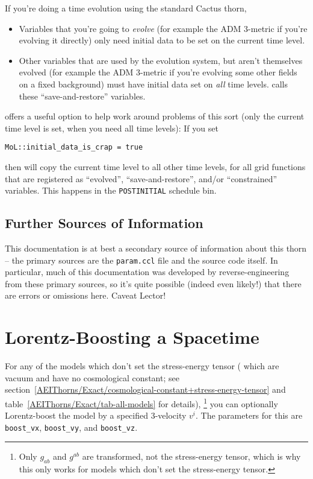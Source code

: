 If you're doing a time evolution using the standard Cactus 
thorn,
\begin{itemize}
\item	Variables that you're going to \emph{evolve}
	(for example the ADM 3-metric if you're evolving
	it directly) only need initial data to be set
	on the current time level.
\item	Other variables that are used by the evolution system,
	but aren't themselves evolved (for example the ADM 3-metric
	if you're evolving some other fields on a fixed background)
	must have initial data set on \emph{all} time levels.
	 calls these ``save-and-restore'' variables.
\end{itemize}

 offers a useful option to help work around problems
of this sort (only the current time level is set, when you need
all time levels):  If you set
\begin{verbatim}
MoL::initial_data_is_crap = true
\end{verbatim}
then  will copy the current time level to all other time
levels, for all grid functions that are registered as ``evolved'',
``save-and-restore'', and/or ``constrained'' variables.  This happens
in the \verb|POSTINITIAL| schedule bin.


\subsection{Further Sources of Information}

This documentation is at best a secondary source of information about
this thorn -- the primary sources are the \verb|param.ccl| file and
the source code itself.  In particular, much of this documentation
was developed by reverse-engineering from these primary sources, so
it's quite possible (indeed even likely!) that there are errors or
omissions here.  Caveat Lector!


\section{Lorentz-Boosting a Spacetime}
\label{AEIThorns/Exact/sect-Lorentz-boosting-a-spacetime}

For any of the models which don't set the stress-energy tensor
(\ie{} which are vacuum and have no cosmological constant;
see section~\ref{AEIThorns/Exact/cosmological-constant+stress-energy-tensor}
and table~\ref{AEIThorns/Exact/tab-all-models} for details),%
\footnote{%
	 Only $g_{ab}$ and $g^{ab}$ are transformed, not the
	 stress-energy tensor, which is why this only works
	 for models which don't set the stress-energy tensor.
	 }%
{} you can optionally Lorentz-boost the model by a specified 3-velocity
$v^i$.  The parameters for this are \verb|boost_vx|, \verb|boost_vy|,
and \verb|boost_vz|.

